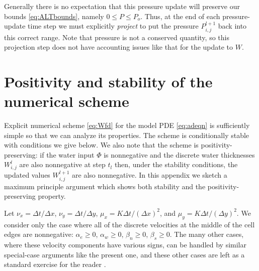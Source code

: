 \documentclass[12pt,final]{amsart}%
\newcommand{\Wlij}{W^l_{i,j}}
\begin{document}
Generally there is no expectation that this pressure update will preserve our bounds \eqref{eq:ALTbounds}, namely $0\le P \le P_o$.  Thus, at the end of each pressure-update time step we must explicitly \emph{project} to put the pressure $P_{i,j}^{l+1}$ back into this correct range.  Note that pressure is not a conserved quantity, so this projection step does not have accounting issues like that for the update to $W$.


\small



\small
\appendix

\section{Positivity and stability of the numerical scheme}

Explicit numerical scheme \eqref{eq:Wfd} for the model PDE \eqref{eq:adeqn} is sufficiently simple so that we can analyze its properties.  The scheme is conditionally stable with conditions we give below.  We also note that the scheme is positivity-preserving: if the water input $\Phi$ is nonnegative and the discrete water thicknesses $\Wlij$ are also nonnegative at step $t_l$ then, under the stability conditions, the updated values $W_{i,j}^{l+1}$ are also nonnegative.  In this appendix we sketch a maximum principle argument \citep{MortonMayers} which shows both stability and the positivity-preserving property.

Let $\nu_x = \Delta t/\Delta x$, $\nu_y = \Delta t/\Delta y$, $\mu_x = K \Delta t / (\Delta x)^2$, and $\mu_y = K \Delta t / (\Delta y)^2$.  We consider only the case where all of the discrete velocities at the middle of the cell edges are nonnegative: $\alpha_e\ge 0$, $\alpha_w\ge 0$, $\beta_n\ge 0$, $\beta_s\ge 0$.  The many other cases, where these velocity components have various signs, can be handled by similar special-case arguments like the present one, and these other cases are left as a standard exercise for the reader \citep{MortonMayers}.
\end{document}
